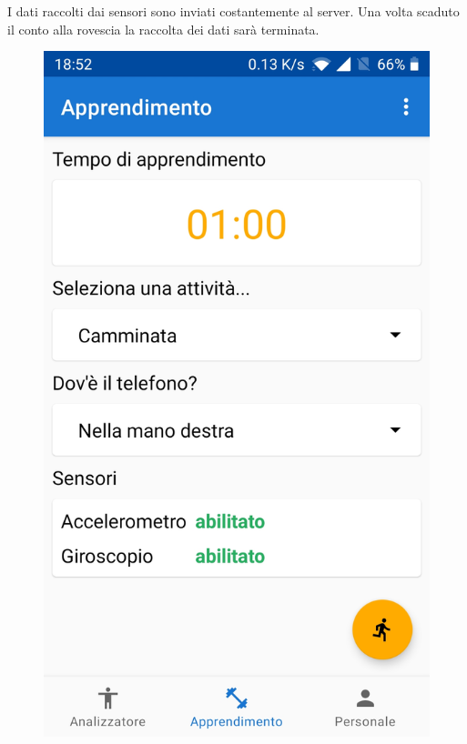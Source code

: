 I dati raccolti dai sensori sono inviati costantemente al server. Una volta scaduto il conto alla rovescia la raccolta dei dati sarà terminata.

\begin{figure}[H]
    \centering
    \includegraphics[scale = 0.10]{assets/images/screenshots/2a_Init.jpg}

\end{figure}
